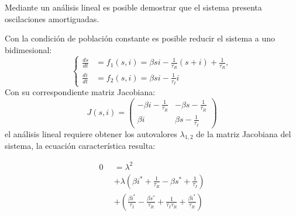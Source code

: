\documentclass[twocolumn,aps,prl]{revtex4-1}
\newcommand*\sepline{%
  \begin{center}
    \rule[1ex]{.5\textwidth}{.5pt}
  \end{center}}
\begin{document}
Mediante un análisis lineal es posible demostrar que el sistema presenta oscilaciones amortiguadas. 

Con la condición de población constante es posible reducir el sistema a uno bidimesional:
$$ \left\lbrace
\begin{aligned}
\frac{d s}{d t} &= f_1(s, i) = \beta s i - \frac{1}{\tau_{R}} (s+i) +  \frac{1}{\tau_{R}}   , \\
\frac{d i}{d t} &= f_2(s, i) = \beta s i-\frac{1}{\tau_{I}} i  
\end{aligned}
\right.
$$
Con su correspondiente matriz Jacobiana:
$$
J (s, i) = 
\left(
  \begin{array}{cc}
-\beta i - \frac{1}{\tau_{R}} & -\beta s - \frac{1}{\tau_{R}} \\
 \beta i                     &   \beta s - \frac{1}{\tau_{I}}
  \end{array}
\right)
$$
el análisis lineal requiere obtener los autovalores $\lambda_{1,2}$ de la matriz Jacobiana del sistema, la ecuación característica resulta:








$$
\begin{aligned}
  0 & = \lambda^{2} \\
  \quad & +\lambda\left(\beta i^{*}+\frac{1}{\tau_{R}}-\beta s^{*}+\frac{1}{\tau_{I}}\right) \\
  \quad & +\left(\frac{\beta i^{*}}{\tau_{I}}-\frac{\beta s^{*}}{\tau_{R}}+\frac{1}{\tau_{I} \tau_{R}}+\frac{\beta i^{*}}{\tau_{R}}\right)
\end{aligned}
$$
\end{document}
